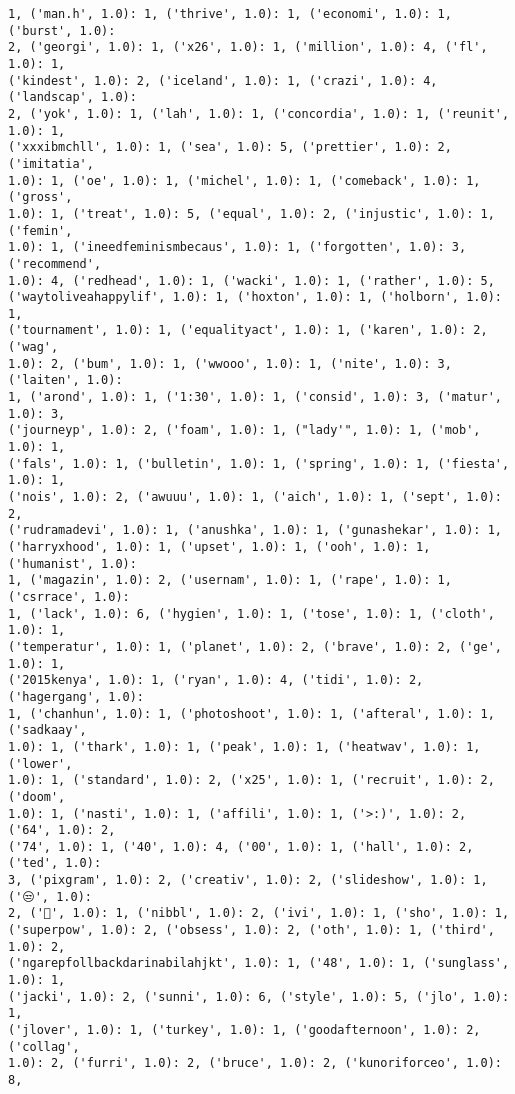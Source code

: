 \documentclass[11pt]{article}
\begin{document}
\begin{Verbatim}[commandchars=\\\{\}]
1, ('man.h', 1.0): 1, ('thrive', 1.0): 1, ('economi', 1.0): 1, ('burst', 1.0):
2, ('georgi', 1.0): 1, ('x26', 1.0): 1, ('million', 1.0): 4, ('fl', 1.0): 1,
('kindest', 1.0): 2, ('iceland', 1.0): 1, ('crazi', 1.0): 4, ('landscap', 1.0):
2, ('yok', 1.0): 1, ('lah', 1.0): 1, ('concordia', 1.0): 1, ('reunit', 1.0): 1,
('xxxibmchll', 1.0): 1, ('sea', 1.0): 5, ('prettier', 1.0): 2, ('imitatia',
1.0): 1, ('oe', 1.0): 1, ('michel', 1.0): 1, ('comeback', 1.0): 1, ('gross',
1.0): 1, ('treat', 1.0): 5, ('equal', 1.0): 2, ('injustic', 1.0): 1, ('femin',
1.0): 1, ('ineedfeminismbecaus', 1.0): 1, ('forgotten', 1.0): 3, ('recommend',
1.0): 4, ('redhead', 1.0): 1, ('wacki', 1.0): 1, ('rather', 1.0): 5,
('waytoliveahappylif', 1.0): 1, ('hoxton', 1.0): 1, ('holborn', 1.0): 1,
('tournament', 1.0): 1, ('equalityact', 1.0): 1, ('karen', 1.0): 2, ('wag',
1.0): 2, ('bum', 1.0): 1, ('wwooo', 1.0): 1, ('nite', 1.0): 3, ('laiten', 1.0):
1, ('arond', 1.0): 1, ('1:30', 1.0): 1, ('consid', 1.0): 3, ('matur', 1.0): 3,
('journeyp', 1.0): 2, ('foam', 1.0): 1, ("lady'", 1.0): 1, ('mob', 1.0): 1,
('fals', 1.0): 1, ('bulletin', 1.0): 1, ('spring', 1.0): 1, ('fiesta', 1.0): 1,
('nois', 1.0): 2, ('awuuu', 1.0): 1, ('aich', 1.0): 1, ('sept', 1.0): 2,
('rudramadevi', 1.0): 1, ('anushka', 1.0): 1, ('gunashekar', 1.0): 1,
('harryxhood', 1.0): 1, ('upset', 1.0): 1, ('ooh', 1.0): 1, ('humanist', 1.0):
1, ('magazin', 1.0): 2, ('usernam', 1.0): 1, ('rape', 1.0): 1, ('csrrace', 1.0):
1, ('lack', 1.0): 6, ('hygien', 1.0): 1, ('tose', 1.0): 1, ('cloth', 1.0): 1,
('temperatur', 1.0): 1, ('planet', 1.0): 2, ('brave', 1.0): 2, ('ge', 1.0): 1,
('2015kenya', 1.0): 1, ('ryan', 1.0): 4, ('tidi', 1.0): 2, ('hagergang', 1.0):
1, ('chanhun', 1.0): 1, ('photoshoot', 1.0): 1, ('afteral', 1.0): 1, ('sadkaay',
1.0): 1, ('thark', 1.0): 1, ('peak', 1.0): 1, ('heatwav', 1.0): 1, ('lower',
1.0): 1, ('standard', 1.0): 2, ('x25', 1.0): 1, ('recruit', 1.0): 2, ('doom',
1.0): 1, ('nasti', 1.0): 1, ('affili', 1.0): 1, ('>:)', 1.0): 2, ('64', 1.0): 2,
('74', 1.0): 1, ('40', 1.0): 4, ('00', 1.0): 1, ('hall', 1.0): 2, ('ted', 1.0):
3, ('pixgram', 1.0): 2, ('creativ', 1.0): 2, ('slideshow', 1.0): 1, ('😒', 1.0):
2, ('🌚', 1.0): 1, ('nibbl', 1.0): 2, ('ivi', 1.0): 1, ('sho', 1.0): 1,
('superpow', 1.0): 2, ('obsess', 1.0): 2, ('oth', 1.0): 1, ('third', 1.0): 2,
('ngarepfollbackdarinabilahjkt', 1.0): 1, ('48', 1.0): 1, ('sunglass', 1.0): 1,
('jacki', 1.0): 2, ('sunni', 1.0): 6, ('style', 1.0): 5, ('jlo', 1.0): 1,
('jlover', 1.0): 1, ('turkey', 1.0): 1, ('goodafternoon', 1.0): 2, ('collag',
1.0): 2, ('furri', 1.0): 2, ('bruce', 1.0): 2, ('kunoriforceo', 1.0): 8,

\end{Verbatim}
\end{document}
